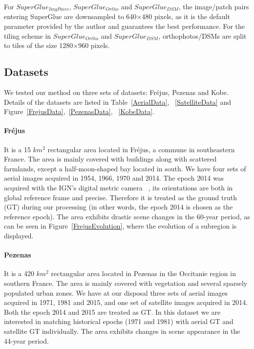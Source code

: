 For $SuperGlue_{ImgPairs}$, $SuperGlue_{Ortho}$ and $SuperGlue_{DSM}$, the image/patch pairs entering SuperGlue are downsampled to 640$\times$480 pixels, as it is the default parameter provided by the author and guarantees the best performance. For the tiling scheme in $SuperGlue_{Ortho}$ and $SuperGlue_{DSM}$, orthophotos/DSMs are split to tiles of the size 1280$\times$960 pixels.


\subsection{Datasets}
We tested our method on three sets of datasets: Fr{\'e}jus, Pezenas and Kobe. Details of the datasets are listed in Table~\ref{AerialData}, ~\ref{SatelliteData} and Figure~\ref{FrejusData},~\ref{PezenasData}, ~\ref{KobeData}.
\par
\paragraph{Fr{\'e}jus} It is a 15 $km^2$ rectangular area located in Fr{\'e}jus, a commune in southeastern France. The area is mainly covered with buildings along with scattered farmlands, except a half-moon-shaped bay located in south. We have four sets of aerial images acquired in 1954, 1966, 1970 and 2014. The epoch 2014 was acquired with the IGN's digital metric camera ~\cite{souchon2010ign}, its orientations are both in global reference frame and precise. Therefore it is treated as the ground truth (GT) during our processing (in other words, the epoch 2014 is chosen as the reference epoch). 
The area exhibits drastic scene changes in the 60-year period, as can be seen in Figure~\ref{FrejusEvolution}, where the evolution of a subregion is displayed.\\
\paragraph{Pezenas} It is a 420 $km^2$ rectangular area located in Pezenas in the Occitanie region in southern France. The area is mainly covered with vegetation and several sparsely populated urban zones. We have at our disposal three sets of aerial images acquired in 1971, 1981 and 2015, and one set of satellite images acquired in 2014. Both the epoch 2014 and 2015 are treated as GT. In this dataset we are interested in matching historical epochs (1971 and 1981) with aerial GT and satellite GT individually. The area exhibits changes in scene appearance in the 44-year period.\\
